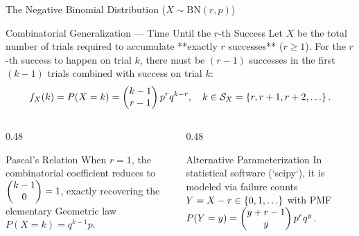 \documentclass[aspectratio=169,xcolor={dvipsnames,table}]{beamer}
\begin{document}
\begin{frame}{The Negative Binomial Distribution ($X \sim \text{BN}(r, p)$)}
	\begin{block}{Combinatorial Generalization --- Time Until the $r$-th Success}
		\small
		Let $X$ be the total number of trials required to accumulate **exactly $r$ successes** ($r \ge 1$). For the $r$-th success to happen on trial $k$, there must be $(r-1)$ successes in the first $(k-1)$ trials combined with success on trial $k$:
		\begin{align*}
			f_X(k) = P(X = k) = \comb{k-1}{r-1} p^r q^{k-r}, \quad k \in \mathcal{S}_X = \set{r, r+1, r+2, \dots}.
		\end{align*}
	\end{block}
	\vspace{-0.15cm}
	\begin{columns}[T]
		\begin{column}{0.48\textwidth}
			\begin{exampleblock}{Pascal's Relation}
				\footnotesize
				When $r=1$, the combinatorial coefficient reduces to $\begin{pmatrix} k-1 \\ 0 \end{pmatrix} = 1$, exactly recovering the elementary Geometric law $P(X=k)=q^{k-1}p$.
			\end{exampleblock}
		\end{column}
		\begin{column}{0.48\textwidth}
			\begin{alertblock}{Alternative Parameterization}
				\footnotesize
				In statistical software (`scipy`), it is modeled via failure counts $Y = X - r \in \set{0, 1, \dots}$ with PMF $P(Y=y) = \begin{pmatrix} y+r-1 \\ y \end{pmatrix}p^r q^y$.
			\end{alertblock}
		\end{column}
	\end{columns}
\end{frame}
\end{document}
